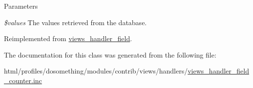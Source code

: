 \begin{DoxyParams}{Parameters}
\item[{\em \$values}]The values retrieved from the database. \end{DoxyParams}


Reimplemented from \hyperlink{classviews__handler__field_a82ff951c5e9ceb97b2eab86f880cbc1e}{views\_\-handler\_\-field}.

The documentation for this class was generated from the following file:\begin{DoxyCompactItemize}
\item 
html/profiles/dosomething/modules/contrib/views/handlers/\hyperlink{views__handler__field__counter_8inc}{views\_\-handler\_\-field\_\-counter.inc}\end{DoxyCompactItemize}

